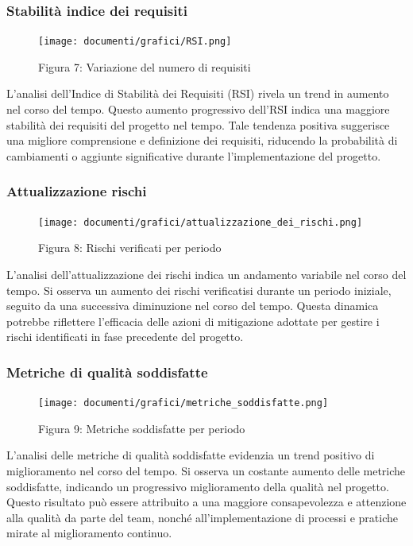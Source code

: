 \documentclass{article}
\begin{document}
\subsubsection{Stabilità indice dei requisiti}
\begin{figure}[H]
    \centering
    \texttt{[image: documenti/grafici/RSI.png]}
    \caption{Figura 7: Variazione del numero di requisiti}
    \end{figure}
    L'analisi dell'Indice di Stabilità dei Requisiti (RSI) rivela un trend in aumento nel corso del tempo. Questo aumento progressivo dell'RSI indica una maggiore stabilità dei requisiti del progetto nel tempo. Tale tendenza positiva suggerisce una migliore comprensione e definizione dei requisiti, riducendo la probabilità di cambiamenti o aggiunte significative durante l'implementazione del progetto.
\subsubsection{Attualizzazione rischi}
\begin{figure}[H]
    \centering
    \texttt{[image: documenti/grafici/attualizzazione\_dei\_rischi.png]}
    \caption{Figura 8: Rischi verificati per periodo}
    \end{figure}
    L'analisi dell'attualizzazione dei rischi indica un andamento variabile nel corso del tempo. Si osserva un aumento dei rischi verificatisi durante un periodo iniziale, seguito da una successiva diminuzione nel corso del tempo. Questa dinamica potrebbe riflettere l'efficacia delle azioni di mitigazione adottate per gestire i rischi identificati in fase precedente del progetto.
\subsubsection{Metriche di qualità soddisfatte}
\begin{figure}[H]
    \centering
    \texttt{[image: documenti/grafici/metriche\_soddisfatte.png]}
    \caption{Figura 9: Metriche soddisfatte per periodo}
    \end{figure}
    L'analisi delle metriche di qualità soddisfatte evidenzia un trend positivo di miglioramento nel corso del tempo. Si osserva un costante aumento delle metriche soddisfatte, indicando un progressivo miglioramento della qualità nel progetto. Questo risultato può essere attribuito a una maggiore consapevolezza e attenzione alla qualità da parte del team, nonché all'implementazione di processi e pratiche mirate al miglioramento continuo.
\end{document}
